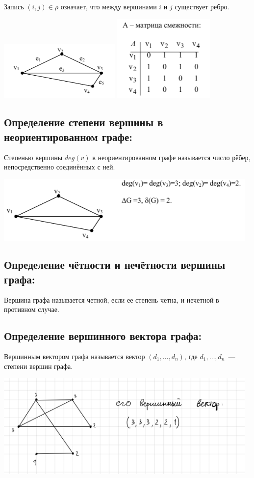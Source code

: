 \documentclass[14pt]{extarticle}
\begin{document}
Запись $(i, j) \in \rho$ означает, что между вершинами $i$ и $j$ существует 
ребро.

\begin{center}
    \includegraphics[width=60mm]{"2.4.1.png"}
    \includegraphics[width=50mm]{"2.4.2.png"}
\end{center}

\subsection{Определение степени вершины в неориентированном графе:}

Степенью вершины $deg(v)$ в неориентированном графе называется число рёбер,
непосредственно соединённых с ней.

\begin{center}
    \includegraphics[width=130mm]{"2.5.1.png"}
\end{center}

\subsection{Определение чётности и нечётности вершины графа:}

Вершина графа называется четной, если ее степень четна,
и нечетной в противном случае.

\subsection{Определение вершинного вектора графа:}

Вершинным вектором графа называется вектор $(d_1, \dots, d_n)$,
где $d_1, \dots, d_n$~--- степени вершин графа.

\begin{center}
    \includegraphics[width=130mm]{"2.7.1.png"}
\end{center}
\end{document}
